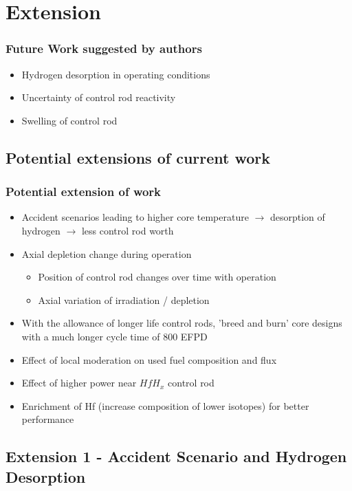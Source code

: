 \documentclass[9pt]{beamer}
\newcommand{\hfh}{$HfH_{x}$\xspace}
\begin{document}
\section{Extension}


\begin{frame}
\frametitle{Future Work suggested by authors}
\begin{itemize}
  \item Hydrogen desorption in operating conditions
  \item Uncertainty of control rod reactivity
  \item Swelling of control rod
\end{itemize}
\end{frame}


\subsection{Potential extensions of current work }
\begin{frame}
\frametitle{Potential extension of work}
\begin{itemize}
  \item Accident scenarios
    leading to higher core temperature $\rightarrow$ desorption of hydrogen $\rightarrow$ less control rod worth
  \item Axial depletion change during operation
  \begin{itemize}
      \item Position of control rod changes over time with operation
      \item Axial variation of irradiation / depletion
  \end{itemize}
  \item With the allowance of longer life control rods, 'breed and burn'
  core designs with a much longer cycle time of 800 EFPD
  \item Effect of local moderation on used fuel composition and flux
  \item Effect of higher power near \hfh control rod
  \item Enrichment of Hf (increase composition of lower isotopes) for better performance
\end{itemize}
\end{frame}

\subsection{Extension 1 - Accident Scenario and Hydrogen Desorption}
\end{document}
